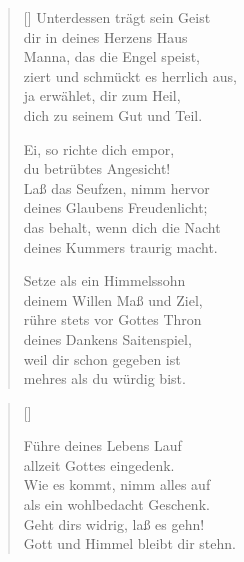 \begin{multicols}{2}
\begin{verse}[\versewidth]
 Unterdessen trägt sein Geist\\
dir in deines Herzens Haus\\
Manna, das die Engel speist,\\
ziert und schmückt es herrlich aus,\\
ja erwählet, dir zum Heil,\\
dich zu seinem Gut und Teil.

 Ei, so richte dich empor,\\
du betrübtes Angesicht!\\
Laß das Seufzen, nimm hervor\\
deines Glaubens Freudenlicht;\\
das behalt, wenn dich die Nacht\\
deines Kummers traurig macht.

 Setze als ein Himmelssohn\\
deinem Willen Maß und Ziel,\\
rühre stets vor Gottes Thron\\
deines Dankens Saitenspiel,\\
weil dir schon gegeben ist\\
mehres als du würdig bist.

\end{verse}
\end{multicols}

\begin{center}
\settowidth{\versewidth}{Der, vor dem die Welt erschrickt,}
\begin{verse}[\versewidth]

 Führe deines Lebens Lauf\\
allzeit Gottes eingedenk.\\
Wie es kommt, nimm alles auf\\
als ein wohlbedacht Geschenk.\\
Geht dirs widrig, laß es gehn!\\
Gott und Himmel bleibt dir stehn.
  
\end{verse}
\end{center}



